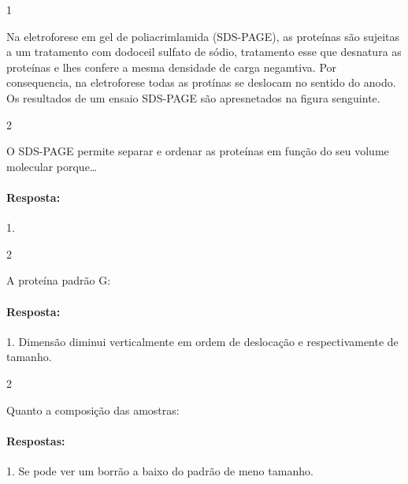 \documentclass[\mainfilename]{subfiles}
\begin{document}
\begin{questionBox}1{}
    
    Na eletroforese em gel de poliacrimlamida (SDS-PAGE), as proteínas são sujeitas a um tratamento com dodoceil sulfato de sódio, tratamento esse que desnatura as proteínas e lhes confere a mesma densidade de carga negamtiva. Por consequencia, na eletroforese todas as protínas se deslocam no sentido do anodo. Os resultados de um ensaio SDS-PAGE são apresnetados na figura senguinte.

    \begin{questionBox}2{}
        
        O SDS-PAGE permite separar e ordenar as proteínas em função do seu volume molecular porque\dots

        \paragraph{Resposta:} 1.
        
    \end{questionBox}

    \begin{questionBox}2{}
        
        A proteína padrão G:

        \paragraph{Resposta:} 1. Dimensão diminui verticalmente em ordem de deslocação e respectivamente de tamanho.
        
    \end{questionBox}

    \begin{questionBox}2{}
        
        Quanto a composição das amostras:
        
        \paragraph{Respostas:} 1. Se pode ver um borrão a baixo do padrão de meno tamanho.
        
    \end{questionBox}

    
\end{questionBox}
\end{document}
